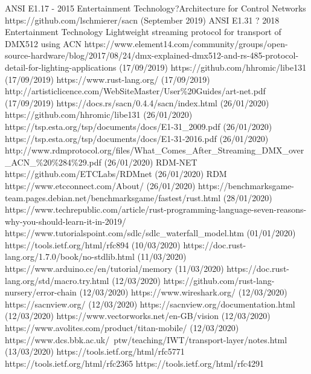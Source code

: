 \documentclass[11pt,a4paper]{report}
\begin{document}
	\begin{thebibliography}{9}
		ANSI E1.17 - 2015 Entertainment Technology?Architecture for Control Networks
		https://github.com/lschmierer/sacn (September 2019)
		ANSI E1.31 ? 2018 Entertainment Technology Lightweight streaming protocol for transport of DMX512 using ACN
		https://www.element14.com/community/groups/open-source-hardware/blog/2017/08/24/dmx-explained-dmx512-and-rs-485-protocol-detail-for-lighting-applications (17/09/2019)
		https://github.com/hhromic/libe131 (17/09/2019)
		https://www.rust-lang.org/ (17/09/2019)
		http://artisticlicence.com/WebSiteMaster/User\%20Guides/art-net.pdf (17/09/2019)
		https://docs.rs/sacn/0.4.4/sacn/index.html
		(26/01/2020)
		https://github.com/hhromic/libe131
		(26/01/2020)
		https://tsp.esta.org/tsp/documents/docs/E1-31\_2009.pdf
		(26/01/2020)
		https://tsp.esta.org/tsp/documents/docs/E1-31-2016.pdf
		(26/01/2020)
		http://www.rdmprotocol.org/files/What\_Comes\_After\_Streaming\_DMX\_over\_ACN\_\%20\%284\%29.pdf (26/01/2020)
		RDM-NET
		https://github.com/ETCLabs/RDMnet (26/01/2020)
		RDM
		https://www.etcconnect.com/About/ (26/01/2020)
		https://benchmarksgame-team.pages.debian.net/benchmarksgame/fastest/rust.html (28/01/2020)
		https://www.techrepublic.com/article/rust-programming-language-seven-reasons-why-you-should-learn-it-in-2019/
		https://www.tutorialspoint.com/sdlc/sdlc\_waterfall\_model.htm (01/01/2020)
		https://tools.ietf.org/html/rfc894 (10/03/2020)
		https://doc.rust-lang.org/1.7.0/book/no-stdlib.html (11/03/2020)
		https://www.arduino.cc/en/tutorial/memory (11/03/2020)
		https://doc.rust-lang.org/std/macro.try.html (12/03/2020)
		https://github.com/rust-lang-nursery/error-chain (12/03/2020)
		https://www.wireshark.org/ (12/03/2020)		
		https://sacnview.org/ (12/03/2020)
		https://sacnview.org/documentation.html (12/03/2020)
		https://www.vectorworks.net/en-GB/vision (12/03/2020)
		https://www.avolites.com/product/titan-mobile/ (12/03/2020)
		https://www.dcs.bbk.ac.uk/~ptw/teaching/IWT/transport-layer/notes.html (13/03/2020)
		https://tools.ietf.org/html/rfc5771
		https://tools.ietf.org/html/rfc2365
		https://tools.ietf.org/html/rfc4291
		
	\end{thebibliography}
	
\end{document}
